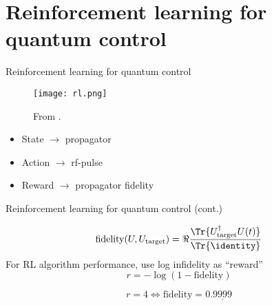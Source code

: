 \documentclass{beamer}
\begin{document}
\section{Reinforcement learning for quantum control}


\begin{frame}{Reinforcement learning for quantum control}

\begin{figure}
\centering
\texttt{[image: rl.png]}

From \cite{sutton2018reinforcement}.
\end{figure}

\begin{itemize}
    \item State $\to$ propagator
    \item Action $\to$ rf-pulse
    \item Reward $\to$ propagator fidelity
\end{itemize}
    
\end{frame}

\begin{frame}{Reinforcement learning for quantum control (cont.)}


\[
    \text{fidelity}(U, U_\text{target}) = \Re{
        \frac{\Tr{U_\text{target}^\dagger U(t)}}{\Tr{\identity}}
    }
\]
For RL algorithm performance, use log infidelity as ``reward''
\[
    r = -\log \left( 1 - \text{fidelity} \right)
\]

\pause

\[
r = 4 \iff \text{fidelity} = 0.\underline{9999}
\]


\end{frame}
\end{document}
